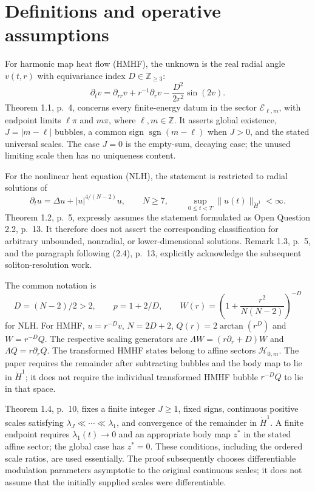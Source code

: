 \documentclass[10pt]{article}
\begin{document}
\section*{Definitions and operative assumptions}
For harmonic map heat flow (HMHF), the unknown is the real radial angle \(v(t,r)\) with equivariance index \(D\in\mathbb Z_{\geq3}\): \[\partial_t v=\partial_{rr}v+r^{-1}\partial_rv
             -\frac{D^2}{2r^2}\sin(2v).\] Theorem 1.1, p. 4, concerns every finite-energy datum in the sector \(\mathcal E_{\ell,m}\), with endpoint limits \(\ell\pi\) and \(m\pi\), where \(\ell,m\in\mathbb Z\). It asserts global existence, \(J=|m-\ell|\) bubbles, a common sign \(\operatorname{sgn}(m-\ell)\) when \(J>0\), and the stated universal scales. The case \(J=0\) is the empty-sum, decaying case; the unused limiting scale then has no uniqueness content.\par
For the nonlinear heat equation (NLH), the statement is restricted to radial solutions of \[\partial_tu=\Delta u+|u|^{4/(N-2)}u,\qquad N\geq7,
 \qquad \sup_{0\leq t<T}\|u(t)\|_{\dot H^1}<\infty.\] Theorem 1.2, p. 5, expressly assumes the statement formulated as Open Question 2.2, p. 13. It therefore does not assert the corresponding classification for arbitrary unbounded, nonradial, or lower-dimensional solutions. Remark 1.3, p. 5, and the paragraph following (2.4), p. 13, explicitly acknowledge the subsequent soliton-resolution work.\par
The common notation is \[D=(N-2)/2>2,\qquad p=1+2/D,\qquad
 W(r)=\left(1+\frac{r^2}{N(N-2)}\right)^{-D}\] for NLH. For HMHF, \(u=r^{-D}v\), \(N=2D+2\), \(Q(r)=2\arctan(r^D)\) and \(W=r^{-D}Q\). The respective scaling generators are \(\Lambda W=(r\partial_r+D)W\) and \(\Lambda Q=r\partial_rQ\). The transformed HMHF states belong to affine sectors \(\mathcal H_{0,m}\). The paper requires the remainder after subtracting bubbles and the body map to lie in \(\dot H^1\); it does not require the individual transformed HMHF bubble \(r^{-D}Q\) to lie in that space.\par
Theorem 1.4, p. 10, fixes a finite integer \(J\geq1\), fixed signs, continuous positive scales satisfying \(\lambda_J\ll\cdots\ll\lambda_1\), and convergence of the remainder in \(\dot H^1\). A finite endpoint requires \(\lambda_1(t)\to0\) and an appropriate body map \(z^*\) in the stated affine sector; the global case has \(z^*=0\). These conditions, including the ordered scale ratios, are used essentially. The proof subsequently chooses differentiable modulation parameters asymptotic to the original continuous scales; it does not assume that the initially supplied scales were differentiable.\par
\end{document}
